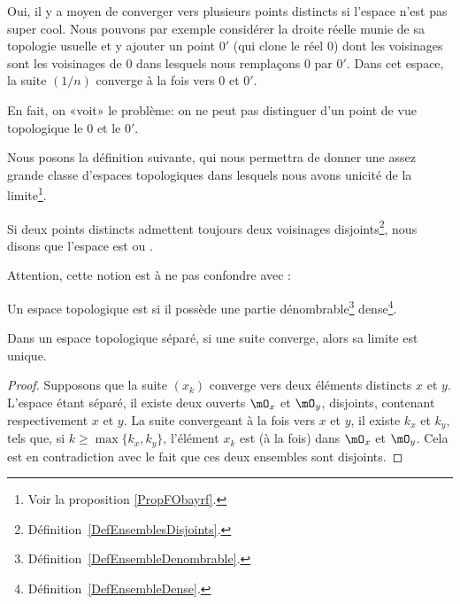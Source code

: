 \begin{example} \label{EXooSHKAooZQEVLB}
    Oui, il y a moyen de converger vers plusieurs points distincts si l'espace n'est pas super cool. Nous pouvons par exemple \cite{EJVQuas} considérer la droite réelle munie de sa topologie usuelle et y ajouter un point $0'$ (qui clone le réel $0$) dont les voisinages sont les voisinages de $0$ dans lesquels nous remplaçons $0$ par $0'$. Dans cet espace, la suite $(1/n)$ converge à la fois vers $0$ et $0'$.

    En fait, on «voit» le problème: on ne peut pas distinguer d'un point de vue topologique le $0$ et le $0'$.
\end{example}

Nous posons la définition suivante, qui nous permettra de donner une assez grande classe d'espaces topologiques dans lesquels nous avons unicité de la limite\footnote{Voir la proposition \ref{PropFObayrf}.}.
\begin{definition}  \label{DefYFmfjjm}\label{DefWEOTrVl}
    Si deux points distincts admettent toujours deux voisinages disjoints\footnote{Définition~\ref{DefEnsemblesDisjoints}.}, nous disons que l'espace est  ou .
\end{definition}

Attention, cette notion est à ne pas confondre avec :
\begin{definition}  \label{DefUADooqilFK}
    Un espace topologique est  si il possède une partie dénombrable\footnote{Définition~\ref{DefEnsembleDenombrable}.} dense\footnote{Définition~\ref{DefEnsembleDense}.}.
\end{definition}

\begin{proposition}\label{PropUniciteLimitePourSuites}
  Dans un espace topologique séparé, si une suite converge, alors sa limite est unique.
\end{proposition}
\begin{proof}
  Supposons que la suite \( (x_k)\) converge vers deux éléments distincts \( x \) et \( y \). L'espace étant séparé, il existe deux ouverts \( \mO_x \) et \( \mO_y \), disjoints, contenant respectivement \( x \) et \( y \). La suite convergeant à la fois vers \( x \) et \( y \), il existe \( k_x \) et \( k_y \), tels que, si \( k \geq \max\{k_x, k_y\} \), l'élément  \( x_k \) est (à la fois) dans  \( \mO_x \) et \( \mO_y \). Cela est en contradiction avec le fait que ces deux ensembles sont disjoints.
\end{proof}


